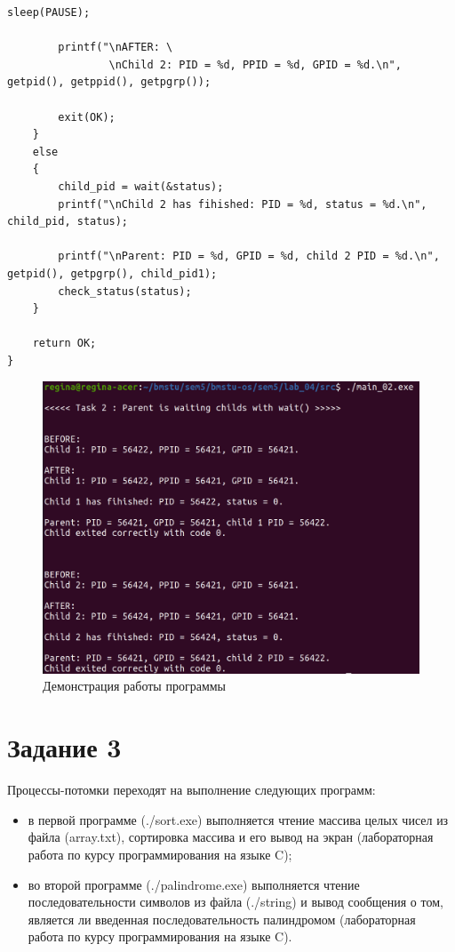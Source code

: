 \begin{center}
\begin{lstlisting}[label=lst:wait,caption=Системный вызов wait()]
        sleep(PAUSE);

        printf("\nAFTER: \
                \nChild 2: PID = %d, PPID = %d, GPID = %d.\n", getpid(), getppid(), getpgrp());

        exit(OK);
    }
    else
    {
        child_pid = wait(&status);
        printf("\nChild 2 has fihished: PID = %d, status = %d.\n", child_pid, status);

        printf("\nParent: PID = %d, GPID = %d, child 2 PID = %d.\n", getpid(), getpgrp(), child_pid1);
        check_status(status);
    }

    return OK;
}
\end{lstlisting}
\end{center}

\begin{figure}[H]
	\begin{center}
		\includegraphics[scale=0.3]{inc/wait.png}
	\end{center}
	\captionsetup{justification=centering}
	\caption{Демонстрация работы программы}
	\label{img:wait}
\end{figure}

\section*{Задание 3}

Процессы-потомки переходят на выполнение следующих программ:

\begin{itemize}
	\item в первой программе (./sort.exe) выполняется чтение массива целых чисел из файла (array.txt), сортировка массива и его вывод на экран (лабораторная работа по курсу программирования на языке C);
	\item во второй программе (./palindrome.exe) выполняется чтение последовательности символов из файла (./string) и вывод сообщения о том, является ли введенная последовательность палиндромом (лабораторная работа по курсу программирования на языке C).
\end{itemize}

